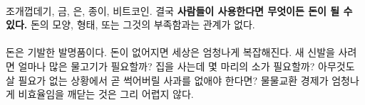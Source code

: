 
\paragraph{}
조개껍데기, 금, 은, 종이, 비트코인. 결국 \textbf{사람들이 사용한다면 무엇이든 돈이 될 수 있다.}
돈의 모양, 형태, 또는 그것의 부족함과는 관계가 없다.


\paragraph{}
돈은 기발한 발명품이다.
돈이 없어지면 세상은 엄청나게 복잡해진다.
새 신발을 사려면 얼마나 많은 물고기가 필요할까? 
집을 사는데 몇 마리의 소가 필요할까? 
아무것도 살 필요가 없는 상황에서 곧 썩어버릴 사과를 없애야 한다면? 
물물교환 경제가 엄청나게 비효율임을 깨닫는 것은 그리 어렵지 않다.



\begin{comment}
	돈의 가장 큰 장점은 무엇과도 교환할 수 있다는 것이다. 정말 대단한 발명품이다. 
	닉 재보\footnote{\url{http://unenumerated.blogspot.com/}}는 
	셸링 아웃: 화폐의 기원(Shelling out\footnote{역주: Shell out은 '지불하다.'라는 뜻으로 쓰이는데, 조개(shell)를 지불하는 데서 유래되었다고 한다.}: The Origins of Money)\cite{shelling-out}에서 
	이에 대해 훌륭하게 요약했다.
	\enquote{우리 인간은 상아, 조개, 특수 뼈와 같은 희귀한 재료로 만든 구슬, 다양한 종류의 장신구, 
		나중에는 은과 금과 같은 희귀 금속까지 모든 종류의 것을 돈으로 사용했다.}
\end{comment}


